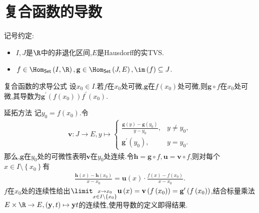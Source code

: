 \section{复合函数的导数}

记号约定:
\begin{itemize}
	\item $I,J$是$\R$中的非退化区间,$E$是Hausdorff的实TVS.
	\item $f\in\Hom_{\mathsf{Set}}\left(I,\R\right),\mathbf{g}\in\Hom_{\mathsf{Set}}\left(J,E\right),\im\left(f\right)\subseteq J$.
\end{itemize}

\begin{proposition}{复合函数的求导公式}{}
	设$x_{0}\in I$.若$f$在$x_{0}$处可微,$\mathbf{g}$在$f\left(x_{0}\right)$处可微,则$\mathbf{g}\circ f$在$x_{0}$处可微,其导数为$\mathbf{g}^{\prime}\left(f\left(x_{0}\right)\right)f^{\prime}\left(x_{0}\right)$.
\end{proposition}

\begin{sketch}{延拓方法}{}
	记$y_{0}=f\left(x_{0}\right)$.令
	\begin{align*}
		\mathbf{v}:J\to E,y\mapsto
		\begin{cases}
			\frac{\mathbf{g}\left(y\right)-\mathbf{g}\left(y_{0}\right)}{y-y_{0}},&y\neq y_{0},\\
			\mathbf{g}^{\prime}\left(y_{0}\right),&y=y_{0}.
		\end{cases}
	\end{align*}
	那么,$\mathbf{g}$在$y_{0}$处的可微性表明$\mathbf{v}$在$y_{0}$处连续.令$\mathbf{h}=\mathbf{g}\circ f,\mathbf{u}=\mathbf{v}\circ f$,则对每个$x\in I\setminus\left\{x_{0}\right\}$有
	\begin{align*}
		\frac{\mathbf{h}\left(x\right)-\mathbf{h}\left(x_{0}\right)}{x-x_{0}}=\mathbf{u}\left(x\right)\cdot\frac{f\left(x\right)-f\left(x_{0}\right)}{x-x_{0}}.
	\end{align*}
	$f$在$x_{0}$处的连续性给出$\limit_{\substack{x\to x_{0}\\ x\in I\setminus\left\{x_{0}\right\}}}\mathbf{u}\left(x\right)=\mathbf{v}\left(f\left(x_{0}\right)\right) = \mathbf{g}^{\prime}\left(f\left(x_{0}\right)\right)$,结合标量乘法 $E\times\R\to E,\left(\mathbf{y},t\right)\mapsto\mathbf{y}t$的连续性,使用导数的定义即得结果.
\end{sketch}






